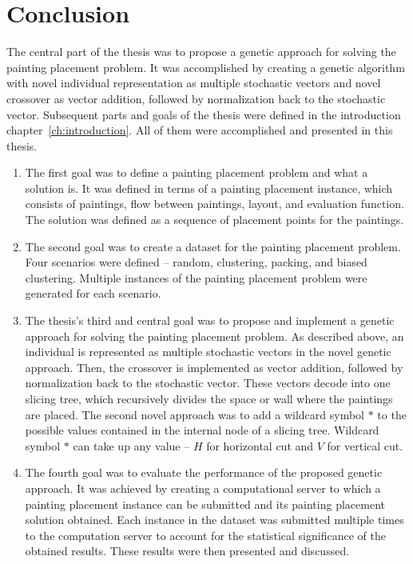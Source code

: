 \chapter{Conclusion}\label{ch:conclusion}

The central part of the thesis was to propose a genetic approach for solving the painting placement problem.
It was accomplished by creating a genetic algorithm with novel individual representation as multiple stochastic vectors
and novel crossover as vector addition, followed by normalization back to the stochastic vector.
Subsequent parts and goals of the thesis were defined in the introduction chapter~\ref{ch:introduction}.
All of them were accomplished and presented in this thesis.

\begin{enumerate}
    \item The first goal was to define a painting placement problem and what a solution is.
    It was defined in terms of a painting placement instance, which consists
    of paintings, flow between paintings, layout, and evaluation function.
    The solution was defined as a sequence of placement points for the paintings.

    \item  The second goal was to create a dataset for the painting placement problem.
    Four scenarios were defined – random, clustering, packing, and biased clustering.
    Multiple instances of the painting placement problem were generated for each scenario.

    \item  The thesis's third and central goal was to propose and implement a genetic approach for solving the painting placement problem.
    As described above, an individual is represented as multiple stochastic vectors in the novel genetic approach.
    Then, the crossover is implemented as vector addition, followed by normalization back to the stochastic vector.
    These vectors decode into one slicing tree, which recursively divides the space or wall where the paintings are placed.
    The second novel approach was to add a wildcard symbol $*$ to the possible values contained in the internal node of a slicing tree.
    Wildcard symbol $*$ can take up any value – $H$ for horizontal cut and $V$ for vertical cut.

    \item  The fourth goal was to evaluate the performance of the proposed genetic approach.
    It was achieved by creating a computational server to which a painting placement
    instance can be submitted and its painting placement solution obtained.
    Each instance in the dataset was submitted multiple times to the computation server to account for the statistical significance of the obtained results.
    These results were then presented and discussed.


\end{enumerate}

